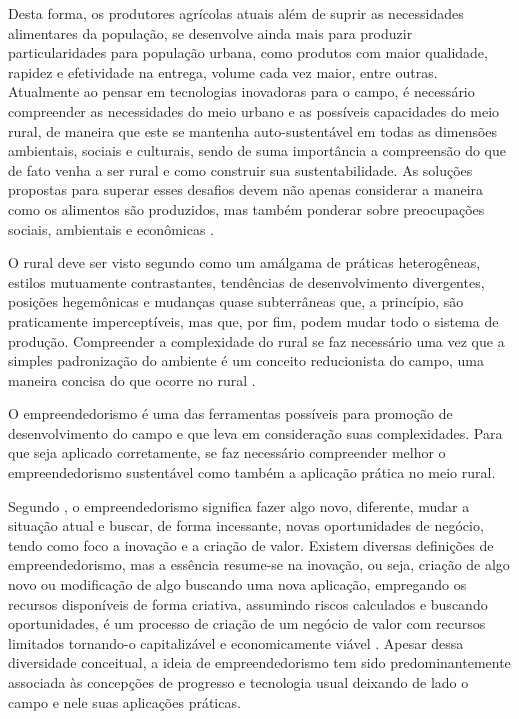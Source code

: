 Desta forma, os produtores agrícolas atuais além de suprir as necessidades alimentares da população, se desenvolve ainda mais para produzir particularidades para população urbana, como produtos com maior qualidade, rapidez e efetividade na entrega, volume cada vez maior, entre outras. Atualmente ao pensar em tecnologias inovadoras para o campo, é necessário compreender as necessidades do meio urbano e as possíveis capacidades do meio rural, de maneira que este se mantenha auto-sustentável em todas as dimensões ambientais, sociais e culturais, sendo de suma importância a compreensão do que de fato venha a ser rural e como construir sua sustentabilidade. As soluções propostas para superar esses desafios devem não apenas considerar a maneira como os alimentos são produzidos, mas também ponderar sobre preocupações sociais, ambientais e econômicas \cite{kamble_achieving_2020}. 

O rural deve ser visto segundo \cite{kageyama_desenvolvimento_2008} como um amálgama de práticas heterogêneas, estilos mutuamente contrastantes, tendências de desenvolvimento divergentes, posições hegemônicas e mudanças quase subterrâneas que, a princípio, são praticamente imperceptíveis, mas que, por fim, podem mudar todo o sistema de produção. Compreender a complexidade do rural se faz necessário uma vez que a simples padronização do ambiente é um conceito reducionista do campo, uma maneira concisa do que ocorre no rural \cite{van_der_ploeg_trajetorias_2011}. 

O empreendedorismo é uma das ferramentas possíveis para promoção de desenvolvimento do campo e que leva em consideração suas complexidades. Para que seja aplicado corretamente, se faz necessário compreender melhor o empreendedorismo sustentável como também a aplicação prática no meio rural. 

Segundo , o empreendedorismo significa fazer algo novo, diferente, mudar a situação atual e buscar, de forma incessante, novas oportunidades de negócio, tendo como foco a inovação e a criação de valor. Existem diversas definições de empreendedorismo, mas a essência resume-se na inovação, ou seja, criação de algo novo ou modificação de algo buscando uma nova aplicação, empregando os recursos disponíveis de forma criativa, assumindo riscos calculados e buscando oportunidades, é um processo de criação de um negócio de valor com recursos limitados tornando-o capitalizável e economicamente viável \cite{costa_empreendedorismo_2006, stevenson_new_1989, lopes_educacao_2010}. Apesar dessa diversidade conceitual, a ideia de empreendedorismo tem sido predominantemente associada às concepções de progresso e tecnologia usual deixando de lado o campo e nele suas aplicações práticas.  

